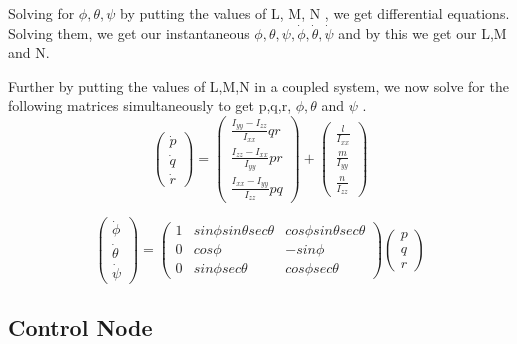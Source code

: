 	Solving for $\phi , \theta , \psi$ by putting the values of L, M, N , we get differential
	equations. Solving them, we get our instantaneous $\phi , \theta , \psi , \dot{\phi} , \dot{\theta} , \dot{\psi}$ and by this
	we get our L,M and N.
	
	Further by putting the values of L,M,N in a coupled system, we now solve
	for the following matrices simultaneously to get p,q,r, $\phi , \theta$ and $\psi$ .
	\begin{equation}
	\begin{pmatrix}
	\dot{p} \\ \dot{q} \\ \dot{r}
	\end{pmatrix}
	= \begin{pmatrix}
	\frac{I_{yy} - I_{zz}}{I_{xx}} qr \\ \frac{I_{zz} - I_{xx}}{I_{yy}} pr \\ \frac{I_{xx} - I_{yy}}{I_{zz}} pq
	\end{pmatrix}
	+ \begin{pmatrix}
	\frac{l}{I_{xx}} \\ \frac{m}{I_{yy}} \\ \frac{n}{I_{zz}}
	\end{pmatrix}
	\end{equation}
	
	\begin{equation}
	\begin{pmatrix}
	\dot{\phi} \\ \dot{\theta} \\ \dot{\psi}
	\end{pmatrix} = \begin{pmatrix}
	1 & sin\phi sin\theta sec\theta & cos\phi sin\theta sec\theta \\
	0 & cos\phi & -sin\phi \\
	0 & sin\phi sec\theta & cos\phi sec\theta
	\end{pmatrix} \begin{pmatrix}
	p \\ q \\ r
	\end{pmatrix}
	\end{equation}
	
	\subsection{Control Node}
	\label{sec:Control Node}
	
